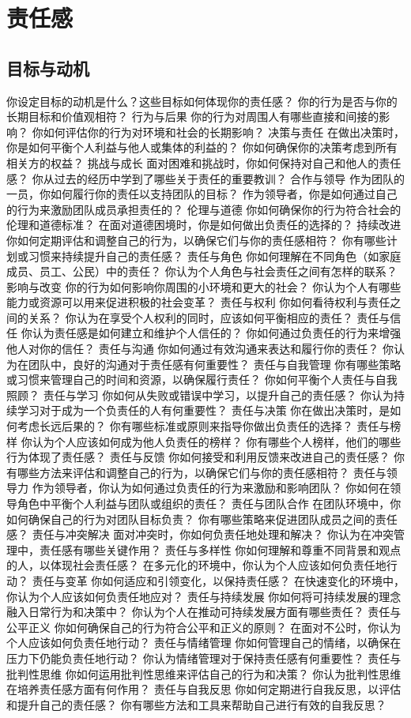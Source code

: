 \documentclass[12pt]{book}
\begin{document}
\section{责任感}
\subsection{目标与动机}
你设定目标的动机是什么？这些目标如何体现你的责任感？
你的行为是否与你的长期目标和价值观相符？
行为与后果
你的行为对周围人有哪些直接和间接的影响？
你如何评估你的行为对环境和社会的长期影响？
决策与责任
在做出决策时，你是如何平衡个人利益与他人或集体的利益的？
你如何确保你的决策考虑到所有相关方的权益？
挑战与成长
面对困难和挑战时，你如何保持对自己和他人的责任感？
你从过去的经历中学到了哪些关于责任的重要教训？
合作与领导
作为团队的一员，你如何履行你的责任以支持团队的目标？
作为领导者，你是如何通过自己的行为来激励团队成员承担责任的？
伦理与道德
你如何确保你的行为符合社会的伦理和道德标准？
在面对道德困境时，你是如何做出负责任的选择的？
持续改进
你如何定期评估和调整自己的行为，以确保它们与你的责任感相符？
你有哪些计划或习惯来持续提升自己的责任感？
责任与角色
你如何理解在不同角色（如家庭成员、员工、公民）中的责任？
你认为个人角色与社会责任之间有怎样的联系？
影响与改变
你的行为如何影响你周围的小环境和更大的社会？
你认为个人有哪些能力或资源可以用来促进积极的社会变革？
责任与权利
你如何看待权利与责任之间的关系？
你认为在享受个人权利的同时，应该如何平衡相应的责任？
责任与信任
你认为责任感是如何建立和维护个人信任的？
你如何通过负责任的行为来增强他人对你的信任？
责任与沟通
你如何通过有效沟通来表达和履行你的责任？
你认为在团队中，良好的沟通对于责任感有何重要性？
责任与自我管理
你有哪些策略或习惯来管理自己的时间和资源，以确保履行责任？
你如何平衡个人责任与自我照顾？
责任与学习
你如何从失败或错误中学习，以提升自己的责任感？
你认为持续学习对于成为一个负责任的人有何重要性？
责任与决策
你在做出决策时，是如何考虑长远后果的？
你有哪些标准或原则来指导你做出负责任的选择？
责任与榜样
你认为个人应该如何成为他人负责任的榜样？
你有哪些个人榜样，他们的哪些行为体现了责任感？
责任与反馈
你如何接受和利用反馈来改进自己的责任感？
你有哪些方法来评估和调整自己的行为，以确保它们与你的责任感相符？
责任与领导力
作为领导者，你认为如何通过负责任的行为来激励和影响团队？
你如何在领导角色中平衡个人利益与团队或组织的责任？
责任与团队合作
在团队环境中，你如何确保自己的行为对团队目标负责？
你有哪些策略来促进团队成员之间的责任感？
责任与冲突解决
面对冲突时，你如何负责任地处理和解决？
你认为在冲突管理中，责任感有哪些关键作用？
责任与多样性
你如何理解和尊重不同背景和观点的人，以体现社会责任感？
在多元化的环境中，你认为个人应该如何负责任地行动？
责任与变革
你如何适应和引领变化，以保持责任感？
在快速变化的环境中，你认为个人应该如何负责任地应对？
责任与持续发展
你如何将可持续发展的理念融入日常行为和决策中？
你认为个人在推动可持续发展方面有哪些责任？
责任与公平正义
你如何确保自己的行为符合公平和正义的原则？
在面对不公时，你认为个人应该如何负责任地行动？
责任与情绪管理
你如何管理自己的情绪，以确保在压力下仍能负责任地行动？
你认为情绪管理对于保持责任感有何重要性？
责任与批判性思维
你如何运用批判性思维来评估自己的行为和决策？
你认为批判性思维在培养责任感方面有何作用？
责任与自我反思
你如何定期进行自我反思，以评估和提升自己的责任感？
你有哪些方法和工具来帮助自己进行有效的自我反思？
\end{document}
